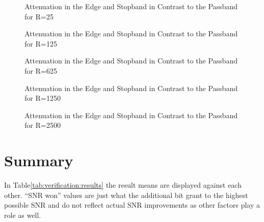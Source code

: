 \begin{figure}
    \centering
    
    \caption[Attenuation in the Edge and Stopband in Contrast to the Passband for R=25]{%
    Attenuation in the Edge and Stopband in Contrast to the Passband for R=25%
    }
    \label{fig:verification:fB25}
\end{figure}

\begin{figure}
    \centering
    
    \caption[Attenuation in the Edge and Stopband in Contrast to the Passband for R=125]{%
    Attenuation in the Edge and Stopband in Contrast to the Passband for R=125%
    }
    \label{fig:verification:fB125}
\end{figure}

\begin{figure}
    \centering
    
    \caption[Attenuation in the Edge and Stopband in Contrast to the Passband for R=625]{%
    Attenuation in the Edge and Stopband in Contrast to the Passband for R=625%
    }
    \label{fig:verification:fB625}
\end{figure}

\begin{figure}
    \centering
    
    \caption[Attenuation in the Edge and Stopband in Contrast to the Passband for R=1250]{%
    Attenuation in the Edge and Stopband in Contrast to the Passband for R=1250%
    }
    \label{fig:verification:fB5}
\end{figure}

\begin{figure}
    \centering
    
    \caption[Attenuation in the Edge and Stopband in Contrast to the Passband for R=2500]{%
    Attenuation in the Edge and Stopband in Contrast to the Passband for R=2500%
    }
    \label{fig:verification:fB5}
\end{figure}

\section{Summary}
\label{sec:verification:summary}

In Table\ref{tab:verification:results} the result means are displayed against each other. ``SNR won'' values are just what the additional bit grant to the highest possible SNR and do not reflect actual SNR improvements as other factors play a role as well.

